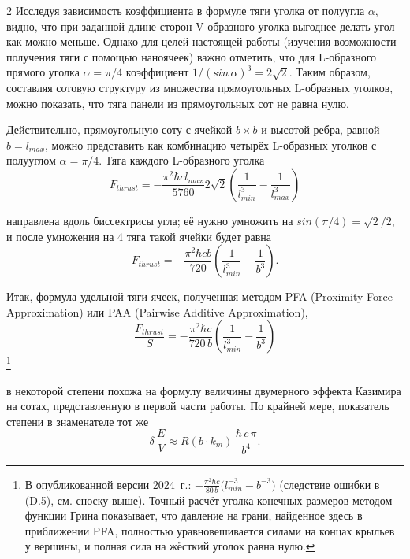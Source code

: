 \documentclass[twoside, 10pt]{article}
\begin{document}
\begin{multicols}{2}
    Исследуя зависимость коэффициента в формуле тяги уголка от полуугла \(\alpha\), видно, что при заданной длине сторон \mbox{V-образного} уголка выгоднее делать угол как можно меньше. Однако для целей настоящей работы (изучения возможности получения тяги с помощью наноячеек) важно отметить, что для \mbox{L-образного} прямого уголка \(\alpha = {\pi}/{4}\) коэффициент
\(1\big/\left(sin\, \alpha\right)^3 = 2\sqrt{2}\).
Таким образом, составляя сотовую структуру из множества прямоугольных \mbox{L-образных} уголков, можно показать, что тяга панели из прямоугольных сот не равна нулю.

Действительно, прямоугольную соту с ячейкой \(b \times b\) и высотой ребра, равной \(b = l_{max}\), можно представить как комбинацию четырёх \mbox{L-образных} уголков с полууглом \(\alpha = {\pi}/{4}\). Тяга каждого \mbox{L-образного} уголка
\noindent
\begin{equation}F_{thrust} = - \frac{\pi^2\hbar c l_{max}}{5760} 2\sqrt{2} \left(\frac{1}{l_{min}^3} - \frac{1}{l_{max}^3}\right)\end{equation}

направлена вдоль биссектрисы угла; её нужно умножить на
\(sin\left({\pi}/{4}\right)={\sqrt{2}}\big/{2}\), и после умножения
на 4 тяга такой ячейки будет равна
\noindent
\begin{equation}F_{thrust} = - \frac{\pi^2\hbar c b}{720} \left(\frac{1}{l_{min}^3} - \frac{1}{b^3}\right).\end{equation}

Итак, формула удельной тяги ячеек, полученная методом PFA (Proximity Force Approximation) или PAA (Pairwise Additive Approximation),
\noindent
\begin{equation}\frac{F_{thrust}}{S} = - \frac{\pi^2\hbar c}{720\, b} \left(\frac{1}{l_{min}^3} - \frac{1}{b^3}\right)\end{equation}\footnote{В опубликованной версии 2024~г.: \(-\frac{\pi^2\hbar c}{80\,b}\big(l_{min}^{-3}-b^{-3}\big)\) (следствие ошибки в (D.5), см. сноску выше). Точный расчёт уголка конечных размеров методом функции Грина \cite{AngleNotebook} показывает, что давление на грани, найденное здесь в приближении PFA, полностью уравновешивается силами на концах крыльев у вершины, и полная сила на жёсткий уголок равна нулю.}

в некоторой степени похожа на формулу величины двумерного эффекта Казимира на сотах, представленную в первой части работы. По крайней мере, показатель степени в знаменателе тот же
\noindent
\begin{equation}\delta\,\frac{E}{V} \approx R\left(b \cdot k_m\right)\,\frac{\hbar\,c\,\pi}{b^4}.\end{equation}


\end{multicols}
\end{document}
